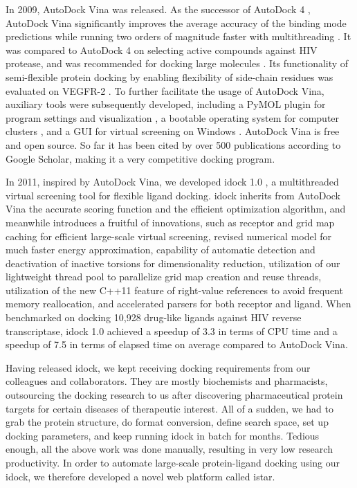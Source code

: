 \documentclass[12pt]{article}
\begin{document}
In 2009, AutoDock Vina \citep{595} was released. As the successor of AutoDock 4 \citep{596}, AutoDock Vina significantly improves the average accuracy of the binding mode predictions while running two orders of magnitude faster with multithreading \citep{595}. It was compared to AutoDock 4 on selecting active compounds against HIV protease, and was recommended for docking large molecules \citep{556}. Its functionality of semi-flexible protein docking by enabling flexibility of side-chain residues was evaluated on VEGFR-2 \citep{1084}. To further facilitate the usage of AutoDock Vina, auxiliary tools were subsequently developed, including a PyMOL plugin for program settings and visualization \citep{609}, a bootable operating system for computer clusters \citep{773}, and a GUI for virtual screening on Windows \citep{1250}. AutoDock Vina is free and open source. So far it has been cited by over 500 publications according to Google Scholar, making it a very competitive docking program.

In 2011, inspired by AutoDock Vina, we developed idock 1.0 \citep{1153}, a multithreaded virtual screening tool for flexible ligand docking. idock inherits from AutoDock Vina the accurate scoring function and the efficient optimization algorithm, and meanwhile introduces a fruitful of innovations, such as receptor and grid map caching for efficient large-scale virtual screening, revised numerical model for much faster energy approximation, capability of automatic detection and deactivation of inactive torsions for dimensionality reduction, utilization of our lightweight thread pool to parallelize grid map creation and reuse threads, utilization of the new C++11 feature of right-value references to avoid frequent memory reallocation, and accelerated parsers for both receptor and ligand. When benchmarked on docking 10,928 drug-like ligands against HIV reverse transcriptase, idock 1.0 achieved a speedup of 3.3 in terms of CPU time and a speedup of 7.5 in terms of elapsed time on average compared to AutoDock Vina.

Having released idock, we kept receiving docking requirements from our colleagues and collaborators. They are mostly biochemists and pharmacists, outsourcing the docking research to us after discovering pharmaceutical protein targets for certain diseases of therapeutic interest. All of a sudden, we had to grab the protein structure, do format conversion, define search space, set up docking parameters, and keep running idock in batch for months. Tedious enough, all the above work was done manually, resulting in very low research productivity. In order to automate large-scale protein-ligand docking using our idock, we therefore developed a novel web platform called istar.
\end{document}
